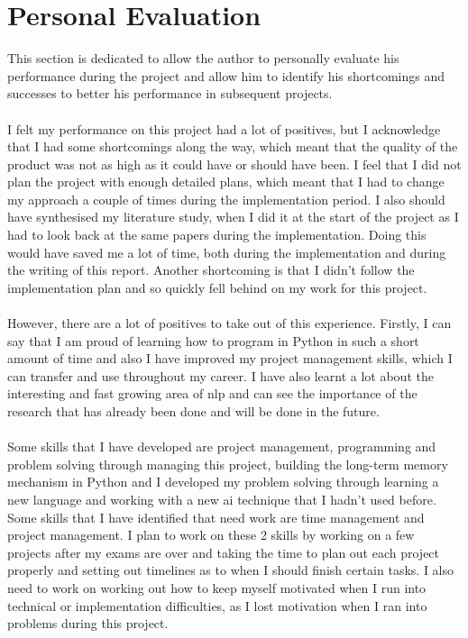 \section{Personal Evaluation}
This section is dedicated to allow the author to personally evaluate his performance during the project and allow him to identify his shortcomings and successes to better his performance in subsequent projects.\\\\
I felt my performance on this project had a lot of positives, but I acknowledge that I had some shortcomings along the way, which meant that the quality of the product was not as high as it could have or should have been. I feel that I did not plan the project with enough detailed plans, which meant that I had to change my approach a couple of times during the implementation period. I also should have synthesised my literature study, when I did it at the start of the project as I had to look back at the same papers during the implementation. Doing this would have saved me a lot of time, both during the implementation and during the writing of this report. Another shortcoming is that I didn't follow the implementation plan and so quickly fell behind on my work for this project. \\\\
However, there are a lot of positives to take out of this experience. Firstly, I can say that I am proud of learning how to program in Python in such a short amount of time and also I have improved my project management skills, which I can transfer and use throughout my career. I have also learnt a lot about the interesting and fast growing area of \gls{nlp} and can see the importance of the research that has already been done and will be done in the future. \\\\
Some skills that I have developed are project management, programming and problem solving through managing this project, building the long-term memory mechanism in Python and I developed my problem solving through learning a new language and working with a new \gls{ai} technique that I hadn't used before. Some skills that I have identified that need work are time management and project management. I plan to work on these 2 skills by working on a few projects after my exams are over and taking the time to plan out each project properly and setting out timelines as to when I should finish certain tasks. I also need to work on working out how to keep myself motivated when I run into technical or implementation difficulties, as I lost motivation when I ran into problems during this project.
